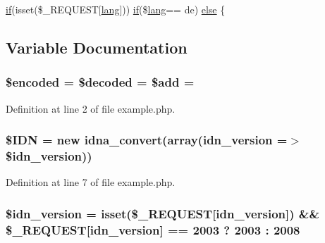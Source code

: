 \begin{DoxyCompactItemize}
\item 
\hyperlink{menu_2tpl_2js_2jquery_8jstree_8js_acba95bef569cfaee32c4ed0212b2bb92}{if}(isset(\$\+\_\+\+R\+E\+Q\+U\+E\+ST\mbox{[}\textquotesingle{}\hyperlink{xe_8min_8js_a23a891e84296aaa19cd3c5a3fc2146ec}{lang}\textquotesingle{}\mbox{]})) \hyperlink{menu_2tpl_2js_2jquery_8jstree_8js_acba95bef569cfaee32c4ed0212b2bb92}{if}(\$\hyperlink{xe_8min_8js_a23a891e84296aaa19cd3c5a3fc2146ec}{lang}== \textquotesingle{}de\textquotesingle{}) \hyperlink{example_8php_a62bf8b36de1aa08b54e9822dc49899aa}{else} \{
\end{DoxyCompactItemize}


\subsection{Variable Documentation}
\subsubsection[{\texorpdfstring{\$encoded}{$encoded}}]{\setlength{\rightskip}{0pt plus 5cm}\$encoded = \$decoded = \${\bf add} = \textquotesingle{}\textquotesingle{}}\hypertarget{example_8php_af709b460501204e2ec7e34e96e7de576}{}\label{example_8php_af709b460501204e2ec7e34e96e7de576}


Definition at line 2 of file example.\+php.

\subsubsection[{\texorpdfstring{\$\+I\+DN}{$IDN}}]{\setlength{\rightskip}{0pt plus 5cm}\$I\+DN = new {\bf idna\+\_\+convert}(array(\textquotesingle{}idn\+\_\+version\textquotesingle{} =$>$ \$idn\+\_\+version))}\hypertarget{example_8php_aa45ac61e5ada434ea385befcd1aea16d}{}\label{example_8php_aa45ac61e5ada434ea385befcd1aea16d}


Definition at line 7 of file example.\+php.

\subsubsection[{\texorpdfstring{\$idn\+\_\+version}{$idn_version}}]{\setlength{\rightskip}{0pt plus 5cm}\$idn\+\_\+version = isset(\$\+\_\+\+R\+E\+Q\+U\+E\+ST\mbox{[}\textquotesingle{}idn\+\_\+version\textquotesingle{}\mbox{]}) \&\& \$\+\_\+\+R\+E\+Q\+U\+E\+ST\mbox{[}\textquotesingle{}idn\+\_\+version\textquotesingle{}\mbox{]} == 2003 ? 2003 \+: 2008}\hypertarget{example_8php_aaa64132973e10962c52265cfbee1cb9c}{}\label{example_8php_aaa64132973e10962c52265cfbee1cb9c}



